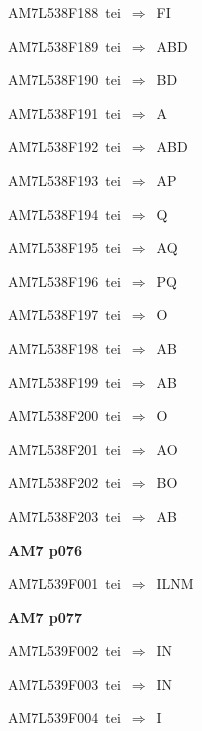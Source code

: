 {\sixrm AM7L538F188\ {\sixit tei}\ }$\Rightarrow$\ FI\par\smallskip
{\sixrm AM7L538F189\ {\sixit tei}\ }$\Rightarrow$\ ABD\par\smallskip
{\sixrm AM7L538F190\ {\sixit tei}\ }$\Rightarrow$\ BD\par\smallskip
{\sixrm AM7L538F191\ {\sixit tei}\ }$\Rightarrow$\ A\par\smallskip
{\sixrm AM7L538F192\ {\sixit tei}\ }$\Rightarrow$\ ABD\par\smallskip
{\sixrm AM7L538F193\ {\sixit tei}\ }$\Rightarrow$\ AP\par\smallskip
{\sixrm AM7L538F194\ {\sixit tei}\ }$\Rightarrow$\ Q\par\smallskip
{\sixrm AM7L538F195\ {\sixit tei}\ }$\Rightarrow$\ AQ\par\smallskip
{\sixrm AM7L538F196\ {\sixit tei}\ }$\Rightarrow$\ PQ\par\smallskip
{\sixrm AM7L538F197\ {\sixit tei}\ }$\Rightarrow$\ O\par\smallskip
{\sixrm AM7L538F198\ {\sixit tei}\ }$\Rightarrow$\ AB\par\smallskip
{\sixrm AM7L538F199\ {\sixit tei}\ }$\Rightarrow$\ AB\par\smallskip
{\sixrm AM7L538F200\ {\sixit tei}\ }$\Rightarrow$\ O\par\smallskip
{\sixrm AM7L538F201\ {\sixit tei}\ }$\Rightarrow$\ AO\par\smallskip
{\sixrm AM7L538F202\ {\sixit tei}\ }$\Rightarrow$\ BO\par\smallskip
{\sixrm AM7L538F203\ {\sixit tei}\ }$\Rightarrow$\ AB\par\smallskip

\par\vfill\eject
{\bf\hfill AM7 p076\hfill\hbox{}}\par\bigskip
{\sixrm AM7L539F001\ {\sixit tei}\ }$\Rightarrow$\ ILNM\par\smallskip

\par\vfill\eject
{\bf\hfill AM7 p077\hfill\hbox{}}\par\bigskip
{\sixrm AM7L539F002\ {\sixit tei}\ }$\Rightarrow$\ IN\par\smallskip
{\sixrm AM7L539F003\ {\sixit tei}\ }$\Rightarrow$\ IN\par\smallskip
{\sixrm AM7L539F004\ {\sixit tei}\ }$\Rightarrow$\ I\par\smallskip

